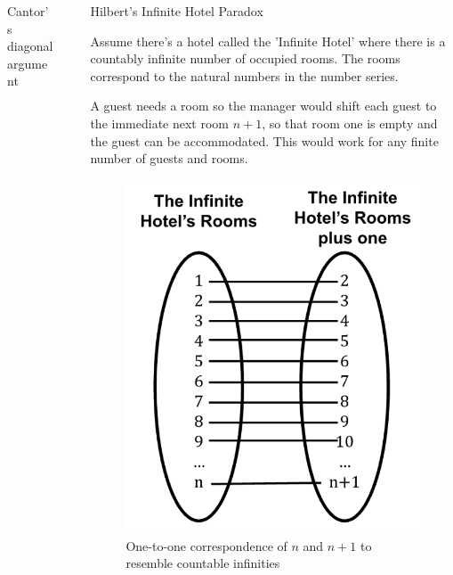 \documentclass[final]{beamer}
\newlength{\sepwidth}
\newlength{\colwidth}
\newcommand{\separatorcolumn}{\begin{column}{\sepwidth}\end{column}}
\begin{document}
\begin{frame}[t]
\begin{columns}[t]
\begin{column}{\colwidth}
\begin{block}{Cantor's diagonal argument}
  \end{block}

  
\end{column}

\separatorcolumn

\begin{column}{\colwidth}

  \begin{exampleblock}{Hilbert's Infinite Hotel Paradox}


    Assume there's a hotel called the 'Infinite Hotel' where there is a countably infinite number of occupied rooms. The rooms correspond to the natural numbers in the number series.
    
    A guest needs a room so the manager would shift each guest to the immediate next room $n+1$,  so that room one is empty and the guest can be accommodated. This would work for any finite number of guests and rooms. 

\begin{figure}
    \centering
    \includegraphics[width=0.4\linewidth]{hilberthotel_n+1.png}
    \caption{One-to-one correspondence of $n$ and $n+1$ to resemble countable infinities}
    \label{fig:enter-label}
\end{figure}



\end{exampleblock}
\end{column}
\end{columns}
\end{frame}
\end{document}
